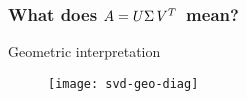 \begin{frame}[plain]
	\frametitle{What does $A = U \Sigma \,{V}^{T}\,$ mean?}
	\begin{block}{Geometric interpretation}
    \begin{center}
      \begin{figure}[H]
        \centering
        \texttt{[image: svd-geo-diag]}
      \end{figure}
    \end{center}
	\end{block} 
\end{frame}
